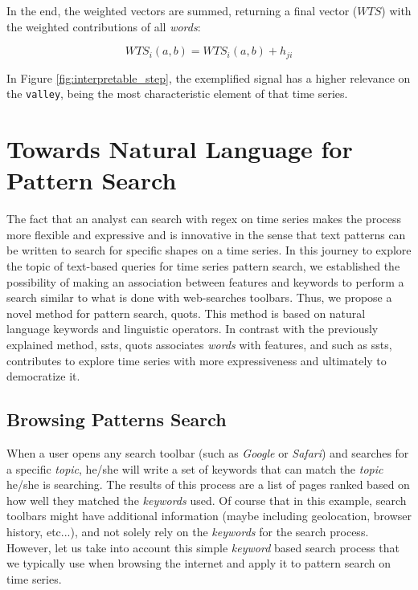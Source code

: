 In the end, the  weighted vectors are summed, returning a final vector ($WTS$) with the weighted contributions of all \textit{words}:

\begin{equation}
WTS_i(a, b) = WTS_i(a, b) + h_{ji}
\end{equation}

In Figure \ref{fig:interpretable_step}, the exemplified signal has a higher relevance on the \texttt{valley}, being the most characteristic element of that time series.

\section{Towards Natural Language for Pattern Search}

The fact that an analyst can search with \gls{regex} on time series makes the process more flexible and expressive and is innovative in the sense that text patterns can be written to search for specific shapes on a time series. In this journey to explore the topic of text-based queries for time series pattern search, we established the possibility of making an association between features and keywords to perform a search similar to what is done with web-searches toolbars. Thus, we propose a novel method for pattern search, \gls{quots}. This method is based on natural language keywords and linguistic operators. In contrast with the previously explained method, \gls{ssts}, \gls{quots} associates \textit{words} with features, and such as \gls{ssts}, contributes to explore time series with more expressiveness and ultimately to democratize it.

\subsection{Browsing Patterns Search}

When a user opens any search toolbar (such as \textit{Google} or \textit{Safari}) and searches for a specific \textit{topic}, he/she will write a set of keywords that can match the \textit{topic} he/she is searching. The results of this process are a list of pages ranked based on how well they matched the \textit{keywords} used. Of course that in this example, search toolbars might have additional information (maybe including geolocation, browser history, etc...), and not solely rely on the \textit{keywords} for the search process. However, let us take into account this simple \textit{keyword} based search process that we typically use when browsing the internet and apply it to pattern search on time series.

